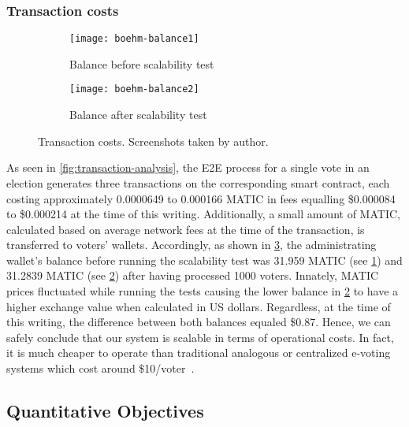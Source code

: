 \subsubsection{Transaction costs}\label{subsubsec:res-transaction-costs}

\begin{figure}[h]
    \begin{subfigure}[b]{0.5\textwidth}
        \centering
        \texttt{[image: boehm-balance1]}
        \caption{Balance before scalability test}
        \label{fig:balance-before}
    \end{subfigure}
    \begin{subfigure}[b]{0.5\textwidth}
        \centering
        \texttt{[image: boehm-balance2]}
        \caption{Balance after scalability test}
        \label{fig:balance-after}
    \end{subfigure}
    \caption{Transaction costs. Screenshots taken by author.}
    \label{fig:transaction-costs}
\end{figure}

As seen in \cref{fig:transaction-analysis}, the \gls{E2E} process for a single vote in an election generates three transactions on the corresponding smart contract, each costing approximately 0.0000649 to 0.000166 MATIC in fees equalling \$0.000084 to \$0.000214 at the time of this writing.
Additionally, a small amount of MATIC, calculated based on average network fees at the time of the transaction, is transferred to voters' wallets.
Accordingly, as shown in \cref{fig:transaction-costs}, the administrating wallet's balance before running the scalability test was 31.959 MATIC (see \cref{fig:balance-before}) and 31.2839 MATIC (see \cref{fig:balance-after}) after having processed 1000 voters.
Innately, MATIC prices fluctuated while running the tests causing the lower balance in \cref{fig:balance-after} to have a higher exchange value when calculated in US dollars.
Regardless, at the time of this writing, the difference between both balances equaled \$0.87.
Hence, we can safely conclude that our system is scalable in terms of operational costs.
In fact, it is much cheaper to operate than traditional analogous or centralized e-voting systems which cost around \$10/voter~\autocite{mohr_how_nodate}.


\subsection{Quantitative Objectives}\label{subsec:res-quantitaive-objectives}

